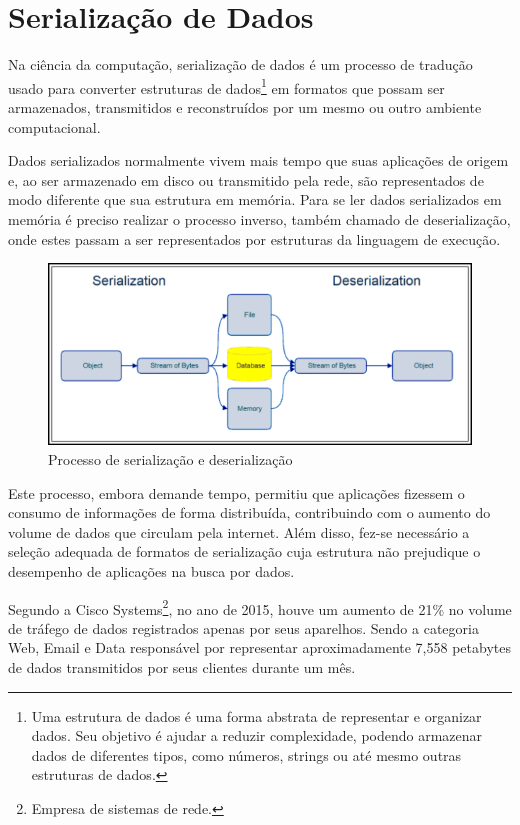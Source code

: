 \section[Serialização de Dados]{Serialização de Dados}

Na ciência da computação, serialização de dados é um processo de tradução usado para converter estruturas de dados\footnote{
  Uma estrutura de dados é uma forma abstrata de representar e organizar dados. Seu objetivo é ajudar a reduzir complexidade, podendo armazenar dados de diferentes tipos, como números, strings ou até mesmo outras estruturas de dados.
} em formatos que possam ser armazenados, transmitidos e reconstruídos por um mesmo ou outro ambiente computacional. \cite{Cline2016}

Dados serializados normalmente vivem mais tempo que suas aplicações de origem e, ao ser armazenado em disco ou transmitido pela rede, são representados de modo diferente que sua estrutura em memória. Para se ler dados serializados em memória é preciso realizar o processo inverso, também chamado de deserialização, onde estes passam a ser representados por estruturas da linguagem de execução. \cite{Guller2016}

\begin{figure}[H]
  \centering
  \includegraphics[width=\textwidth,height=\textheight,keepaspectratio]{figuras/data-serialization-deserialization.png}
  \caption{Processo de serialização e deserialização}
\end{figure}

Este processo, embora demande tempo, permitiu que aplicações fizessem o consumo de informações de forma distribuída, contribuindo com o aumento do volume de dados que circulam pela internet. Além disso, fez-se necessário a seleção adequada de formatos de serialização cuja estrutura não prejudique o desempenho de aplicações na busca por dados. \cite{SumarayMakki2012}

Segundo a Cisco Systems\footnote{
  Empresa de sistemas de rede.
}, no ano de 2015, houve um aumento de 21\% no volume de tráfego de dados registrados apenas por seus aparelhos. Sendo a categoria Web, Email e Data responsável por representar aproximadamente 7,558 petabytes de dados transmitidos por seus clientes durante um mês. \cite{Cisco2016}

